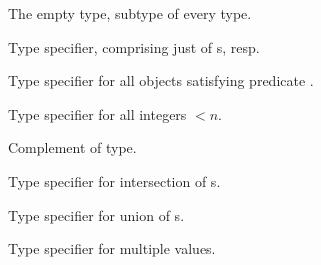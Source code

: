 \begin{LIST}{1cm}
  The empty type, subtype of every type.

  Type specifier, comprising just  of s, resp.

  Type specifier for all objects satisfying predicate . 

  Type specifier for all integers $<n$.
  
  Complement of type.

  Type specifier for intersection of s.

  Type specifier for union of s.

  Type specifier for multiple values.

  \end{LIST}


